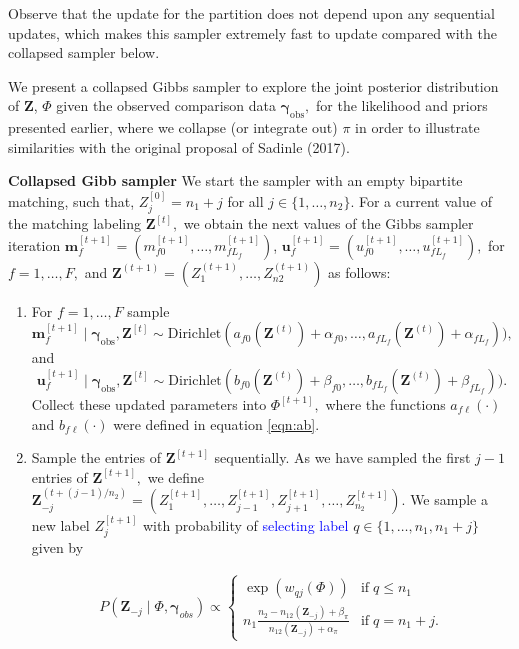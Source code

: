 \documentclass{article}
\newcommand{\bam}{\boldsymbol{m}}
\newcommand{\bu}{\boldsymbol{u}}
\newcommand{\bZ}{\boldsymbol{Z}}
\newcommand{\bgamma}{\boldsymbol{\gamma}}
\begin{document}
\begin{enumerate}
Observe that the update for the partition does not depend upon any sequential updates, which makes this sampler extremely fast to update compared with the collapsed sampler below.


We present a collapsed Gibbs sampler to explore the joint posterior distribution of $\bZ$, $\Phi$ given the observed comparison data 
$\bgamma_{\text{obs}},$ for the likelihood and priors presented earlier, where we collapse (or integrate out) $\pi$ in order to illustrate similarities with the original proposal of Sadinle (2017). 

\textbf{Collapsed Gibb sampler}
We start the sampler with an empty bipartite matching, such that, $Z_{j}^{[0]} = n_1 + j$ for all $j \in \{1, \ldots, n_2 \}.$ For a current value of the matching labeling $\bZ^{[t]},$ we obtain the next values of the Gibbs sampler iteration 
$\bam_f^{[t+1]} = (m_{f0}^{[t+1]}, \ldots, m_{f L_f}^{[t+1]})$, 
$\bu_f^{[t+1]} =  (u_{f0}^{[t+1]}, \ldots, u_{f L_f}^{[t+1]}),$ for $f=1, \ldots, F,$ and $\bZ^{(t+1)} = (Z_1^{(t+1)}, \ldots, Z_{n2}^{(t+1)})$ as follows:

\begin{enumerate}
\item For $f=1, \ldots, F$ sample
$$\bam_f^{[t+1]} \mid \bgamma_{\text{obs}}, \bZ^{[t]} \sim
\text{Dirichlet}(
a_{f0}(\bZ^{(t)})  + \alpha_{f0}, \ldots, a_{f L_f}(\bZ^{(t)} ) + \alpha_{f L_f})
),
$$
and
$$\bu_f^{[t+1]} \mid \bgamma_{\text{obs}}, \bZ^{[t]} \sim
\text{Dirichlet}(
b_{f0}(\bZ^{(t)})  + \beta_{f0}, \ldots, b_{f L_f}(\bZ^{(t)} ) + \beta_{f L_f})
). 
$$
Collect these updated parameters into $\Phi^{[t+1]},$ where the functions $a_{f \ell}(\cdot)$ and $b_{f \ell}(\cdot)$ were defined in equation \ref{eqn:ab}. 

\item Sample the entries of $\bZ^{[t+1]}$ sequentially. As we have sampled the first $j-1$ entries of $\bZ^{[t+1]},$ we define 
$\bZ_{-j}^{(t + (j-1)/n_2)} = (
Z_{1}^{[t+1]}, \ldots, Z_{j-1}^{[t+1]}, Z_{j+1}^{[t+1]}, \ldots, Z_{n_2}^{[t+1]}
).
$
We sample a new label $Z_{j}^{[t+1]}$ with probability of \textcolor{blue}{selecting label} $q \in \{1, \ldots, n_1, n_1 + j \}$ given by 

\begin{align}
P(\bZ_{-j} \mid \Phi, \bgamma_{obs}) \propto 
\begin{cases}
\exp(w_{qj}(\Phi) )  & \text{if} \; q \leq n_1 \\
n_1 \frac{n_2- n_{12}(\bZ_{-j}) + \beta_{\pi}}
{n_{12}(\bZ_{-j}) + \alpha_{\pi}
}
   &  \text{if} \; q = n_1 + j.
\end{cases}
\end{align}
\end{enumerate}


\end{enumerate}
\end{document}
